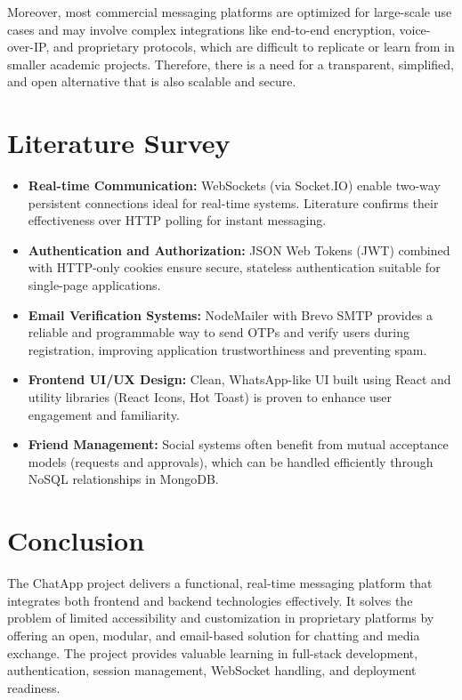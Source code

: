 \documentclass[12pt,a4paper]{report}
\begin{document}
Moreover, most commercial messaging platforms are optimized for large-scale use cases and may involve complex integrations like end-to-end encryption, voice-over-IP, and proprietary protocols, which are difficult to replicate or learn from in smaller academic projects. Therefore, there is a need for a transparent, simplified, and open alternative that is also scalable and secure.

\section{Literature Survey}
\begin{itemize}
    \item \textbf{Real-time Communication:} WebSockets (via Socket.IO) enable two-way persistent connections ideal for real-time systems. Literature confirms their effectiveness over HTTP polling for instant messaging.
    
    \item \textbf{Authentication and Authorization:} JSON Web Tokens (JWT) combined with HTTP-only cookies ensure secure, stateless authentication suitable for single-page applications.
    
    \item \textbf{Email Verification Systems:} NodeMailer with Brevo SMTP provides a reliable and programmable way to send OTPs and verify users during registration, improving application trustworthiness and preventing spam.
    
    \item \textbf{Frontend UI/UX Design:} Clean, WhatsApp-like UI built using React and utility libraries (React Icons, Hot Toast) is proven to enhance user engagement and familiarity.
    
    \item \textbf{Friend Management:} Social systems often benefit from mutual acceptance models (requests and approvals), which can be handled efficiently through NoSQL relationships in MongoDB.
\end{itemize}

\section{Conclusion}
The ChatApp project delivers a functional, real-time messaging platform that integrates both frontend and backend technologies effectively. It solves the problem of limited accessibility and customization in proprietary platforms by offering an open, modular, and email-based solution for chatting and media exchange. The project provides valuable learning in full-stack development, authentication, session management, WebSocket handling, and deployment readiness.
\end{document}
